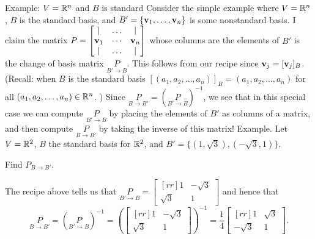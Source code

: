 \begin{frame}{Example: $V={\mathbb R}^n$ and $B$ is standard}
Consider the simple example where $V={\mathbb R}^n$, $B$ is the standard basis, and $B'=\{{\mathbf v}_1,\dots,{\mathbf v}_n\}$ is some nonstandard basis. 
\bspace
I claim the matrix $P=\begin{bmatrix}\vert&\dots &\vert \\ {\mathbf v}_1&\cdots&{\mathbf v}_n\\ \vert&\dots &\vert \end{bmatrix}$ whose columns are the elements of $B'$ is the change of basis matrix $\underset{B'\rightarrow B} P$. This follows from our recipe since ${\mathbf v}_j=[{\mathbf v}_j]_B$. (Recall: when $B$ is the standard basis $[(a_1,a_2,\dots, a_n)]_B=(a_1,a_2,\dots, a_n)$ for all $(a_1,a_2,\dots, a_n)\in{\mathbb R}^n$. )
\bpause Since $\underset{B\rightarrow B'}{P}=(\underset{B'\rightarrow B}{P})^{-1}$, we see that in this special case we can compute $\underset{B'\rightarrow B}{P}$ by placing the elements of $B'$ as columns of a matrix, and then compute $\underset{B\rightarrow B'}{P}$ by taking the inverse of this matrix!
\bpause
\alert{Example}. Let $V={\mathbb R}^2$, $B$ the standard basis for ${\mathbb R}^2$, and $B'=\{(1,\sqrt{3}),(-\sqrt{3},1)\}$. 


Find $P_{B\rightarrow B'}$. 
\begin{bsolution}
The recipe above tells us that $\underset{B'\rightarrow B}{P}=\begin{bmatrix}[rr]1&-\sqrt{3}\\ \sqrt{3}&1 \end{bmatrix}$ and hence that 
\[
\underset{B\rightarrow B'}{P}=(\underset{B'\rightarrow B}{P})^{-1}=\left(\begin{bmatrix}[rr]1&-\sqrt{3}\\ \sqrt{3}&1 \end{bmatrix}\right)^{-1}=\frac{1}{4}\begin{bmatrix}[rr]1&\sqrt{3}\\ -\sqrt{3}&1 \end{bmatrix}.
\]
\end{bsolution}

\end{frame}
